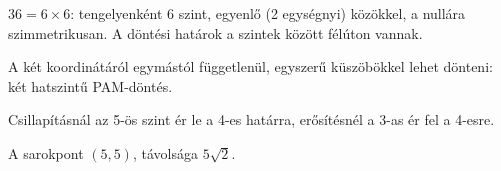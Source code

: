 $36=6\times6$: tengelyenként 6 szint, egyenlő (2 egységnyi) közökkel, a nullára szimmetrikusan. A döntési határok a szintek között félúton vannak.

\begin{center}\end{center}

A két koordinátáról egymástól függetlenül, egyszerű küszöbökkel lehet dönteni: két hatszintű PAM-döntés.

Csillapításnál az 5-ös szint ér le a 4-es határra, erősítésnél a 3-as ér fel a 4-esre.

\begin{center}\end{center}

A sarokpont $(5,5)$, távolsága $5\sqrt2$.

\begin{center}\end{center}



\begin{center}\end{center}

\begin{center}\end{center}

